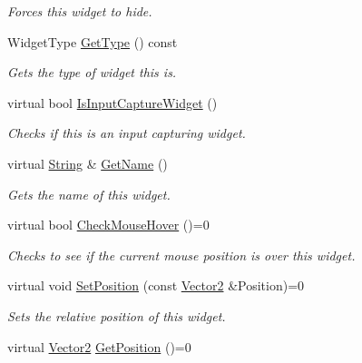 \begin{DoxyCompactItemize}
\begin{DoxyCompactList}\small\item\em Forces this widget to hide. \item\end{DoxyCompactList}\item 
WidgetType \hyperlink{classphys_1_1UI_1_1Widget_a76337b279bd372ce225f94ab1da191ea}{GetType} () const 
\begin{DoxyCompactList}\small\item\em Gets the type of widget this is. \item\end{DoxyCompactList}\item 
virtual bool \hyperlink{classphys_1_1UI_1_1Widget_af8498cbe2d6cf37115cf8ade52e22557}{IsInputCaptureWidget} ()
\begin{DoxyCompactList}\small\item\em Checks if this is an input capturing widget. \item\end{DoxyCompactList}\item 
virtual \hyperlink{namespacephys_aa03900411993de7fbfec4789bc1d392e}{String} \& \hyperlink{classphys_1_1UI_1_1Widget_a35d6e7ce60a9b295d8659345627cf7e0}{GetName} ()
\begin{DoxyCompactList}\small\item\em Gets the name of this widget. \item\end{DoxyCompactList}\item 
virtual bool \hyperlink{classphys_1_1UI_1_1Widget_a613df6dbb42efe139d185043a00259dc}{CheckMouseHover} ()=0
\begin{DoxyCompactList}\small\item\em Checks to see if the current mouse position is over this widget. \item\end{DoxyCompactList}\item 
virtual void \hyperlink{classphys_1_1UI_1_1Widget_a3ef894be2c0868105b2bf495ae944d00}{SetPosition} (const \hyperlink{classphys_1_1Vector2}{Vector2} \&Position)=0
\begin{DoxyCompactList}\small\item\em Sets the relative position of this widget. \item\end{DoxyCompactList}\item 
virtual \hyperlink{classphys_1_1Vector2}{Vector2} \hyperlink{classphys_1_1UI_1_1Widget_a3e464b028b0d1b5755923b8790260c33}{GetPosition} ()=0

\end{DoxyCompactItemize}

